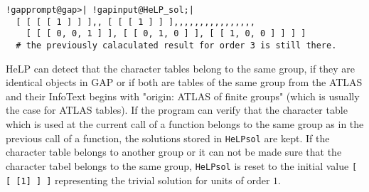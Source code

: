 \documentclass[a4paper,11pt]{report}
\begin{document}
{{\begin{Verbatim}[commandchars=!@|,fontsize=\small,frame=single,label=Example]
  !gapprompt@gap>| !gapinput@HeLP_sol;|
  [ [ [ [ 1 ] ] ],, [ [ [ 1 ] ] ],,,,,,,,,,,,,,,, 
    [ [ [ 0, 0, 1 ] ], [ [ 0, 1, 0 ] ], [ [ 1, 0, 0 ] ] ] ]
  # the previously calaculated result for order 3 is still there.
\end{Verbatim}
 HeLP can detect that the character tables belong to the same group, if they
are identical objects in GAP or if both are tables of the same group from the
ATLAS and their InfoText begins with "origin: ATLAS of finite groups" (which
is usually the case for ATLAS tables). If the program can verify that the
character table which is used at the current call of a function belongs to the
same group as in the previous call of a function, the solutions stored in \texttt{HeLP{\textunderscore}sol} are kept. If the character table belongs to another group or it can not be
made sure that the character tabel belongs to the same group, \texttt{HeLP{\textunderscore}sol} is reset to the initial value \texttt{[ [ [1] ] ]} representing the trivial solution for units of order $1$.

}}
\end{document}
